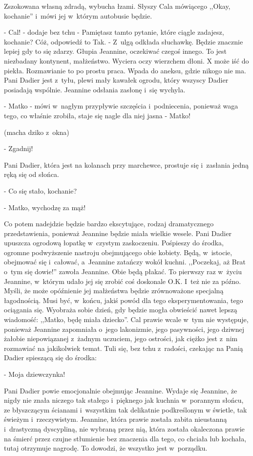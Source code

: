 \documentclass[oneside,polish,12pt,sfheadings]{mwbk}
\begin{document}
Zszokowana własną zdradą, wybucha łzami. Słyszy Cala mówiącego ,,Okay,
kochanie'' i~mówi jej w~którym autobusie będzie.

- Cal! - dodaje bez tchu - Pamiętasz tamto pytanie, które ciągle zadajesz,
kochanie? Cóż, odpowiedź to Tak. - Z~ulgą odkłada słuchawkę. Będzie
znacznie lepiej gdy to się zdarzy. Głupia Jeannine, oczekiwać czegoś
innego. To jest niezbadany kontynent, małżeństwo. Wyciera oczy wierzchem
dłoni. X może iść do piekła. Rozmawianie to po prostu praca. Wpada
do aneksu, gdzie nikogo nie ma. Pani Dadier jest z~tyłu, plewi mały
kawałek ogrodu, który wszyscy Dadier posiadają wspólnie. Jeannine
odsłania zasłonę i~się wychyla.

- Matko - mówi w~nagłym przypływie szczęścia i~podniecenia, ponieważ
waga tego, co właśnie zrobiła, staje się nagle dla niej jasna - Matko!

(macha dziko z~okna) 

- Zgadnij! 

Pani Dadier, która jest na kolanach
przy marchewce, prostuje się i~zasłania jedną ręką się od słońca.

- Co się stało, kochanie?

- Matko, wychodzę za mąż! 

Co potem nadejdzie będzie bardzo ekscytujące,
rodzaj dramatycznego przedstawienia, ponieważ Jeannine będzie miała
wielkie wesele. Pani Dadier upuszcza ogrodową łopatkę w~czystym zaskoczeniu.
Pośpieszy do środka, ogromne podwyższenie nastroju obejmującego obie
kobiety. Będą, w~istocie, obejmować się i~całować, a~Jeannine zatańczy
wokół kuchni. ,,Poczekaj, aż Brat o~tym się dowie!'' zawoła Jeannine.
Obie będą płakać. To pierwszy raz w~życiu Jeannine, w~którym udało
jej się zrobić coś doskonale O.K. I~też nie za późno. Myśli, że może
opóźnienie jej małżeństwa będzie zrównoważone specjalną łagodnością.
Musi być, w~końcu, jakiś powód dla tego eksperymentowania, tego ociągania
się. Wyobraża sobie dzień, gdy będzie mogła obwieścić nawet lepszą
wiadomość: ,,Matko, będę miała dziecko''. Cal prawie wcale w~tym nie
występuje, ponieważ Jeannine zapomniała o~jego lakonizmie, jego pasywności,
jego dziwnej żałobie niepowiązanej z~żadnym uczuciem, jego ostrości,
jak ciężko jest z~nim rozmawiać na jakikolwiek temat. Tuli się, bez
tchu z~radości, czekając na Panią Dadier spieszącą się do środka:

- Moja dziewczynka!

Pani Dadier powie emocjonalnie obejmując Jeannine. Wydaje się Jeannine,
że nigdy nie znała niczego tak stałego i~pięknego jak kuchnia w~porannym
słońcu, ze błyszczącym ścianami i~wszystkim tak delikatnie podkreślonym
w świetle, tak świeżym i~rzeczywistym. Jeannine, która prawie została
zabita nieustanną i~drastyczną dyscypliną, nie wybraną przez nią,
która została okaleczona prawie na śmierć przez czujne stłumienie
bez znaczenia dla tego, co chciała lub kochała, tutaj otrzymuje nagrodę.
To dowodzi, że wszystko jest w~porządku.
\end{document}
